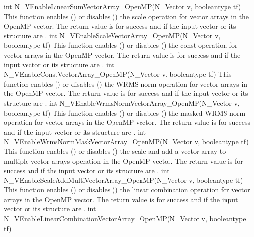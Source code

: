 {
  int N\_VEnableLinearSumVectorArray\_OpenMP(N\_Vector v, booleantype tf)
}
{
  This function enables () or disables () the scale
  operation for vector arrays in the OpenMP vector. The return value is  for
  success and  if the input vector or its  structure are .
}
{
  int N\_VEnableScaleVectorArray\_OpenMP(N\_Vector v, booleantype tf)
}
{
  This function enables () or disables () the const
  operation for vector arrays in the OpenMP vector. The return value is  for
  success and  if the input vector or its  structure are .
}
{
  int N\_VEnableConstVectorArray\_OpenMP(N\_Vector v, booleantype tf)
}
{
  This function enables () or disables () the WRMS norm
  operation for vector arrays in the OpenMP vector. The return value is  for
  success and  if the input vector or its  structure are .
}
{
  int N\_VEnableWrmsNormVectorArray\_OpenMP(N\_Vector v, booleantype tf)
}
{
  This function enables () or disables () the masked WRMS
  norm operation for vector arrays in the OpenMP vector. The return value is
   for success and  if the input vector or its  structure are
  .
}
{
  int N\_VEnableWrmsNormMaskVectorArray\_OpenMP(N\_Vector v, booleantype tf)
}
{
  This function enables () or disables () the scale and
  add a vector array to multiple vector arrays operation in the OpenMP vector. The
  return value is  for success and  if the input vector or its
   structure are .
}
{
  int N\_VEnableScaleAddMultiVectorArray\_OpenMP(N\_Vector v, booleantype tf)
}
{
  This function enables () or disables () the linear
  combination operation for vector arrays in the OpenMP vector. The return value
  is  for success and  if the input vector or its  structure
  are .
}
{
  int N\_VEnableLinearCombinationVectorArray\_OpenMP(N\_Vector v, booleantype tf)
}
